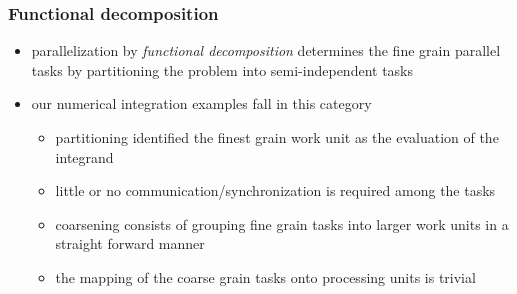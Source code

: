 %
%
%
%


\begin{frame}[fragile]
%
  \frametitle{Functional decomposition}
%
  \begin{itemize}
%
  \item parallelization by {\em functional decomposition} determines the fine grain parallel
    tasks by partitioning the problem into semi-independent tasks
%
  \item our numerical integration examples fall in  this category
    \begin{itemize}
    \item partitioning identified the finest grain work unit as the evaluation of the integrand
    \item little or no communication/synchronization is required among the tasks
    \item coarsening consists of grouping fine grain tasks into larger work units in a straight
      forward manner
    \item the mapping of the coarse grain tasks onto processing units is trivial
    \end{itemize}
%
  \end{itemize}
%
\end{frame}

